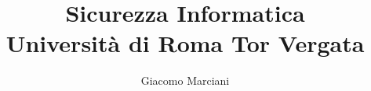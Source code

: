 \documentclass[11pt,a4paper,oneside]{report}
\numberwithin{equation}{section}
\begin{document}
\title{
	{Sicurezza Informatica}\\
	{\large Università di Roma Tor Vergata}\\
}
\author{Giacomo Marciani}
\maketitle

\tableofcontents












\end{document}
